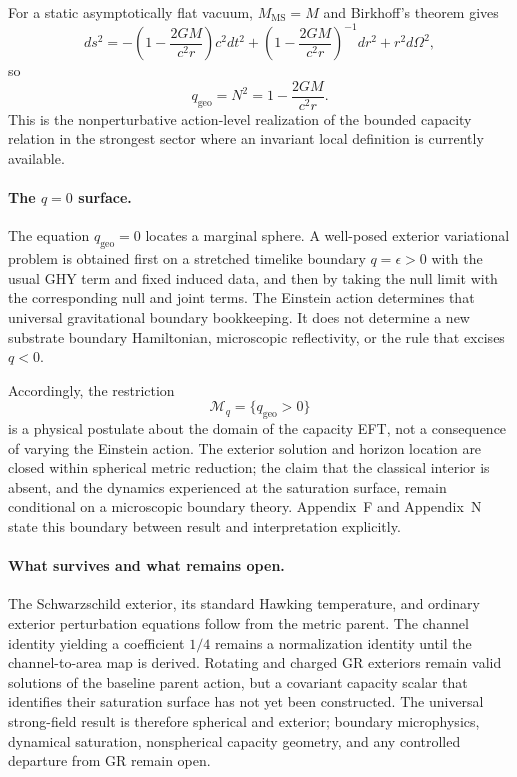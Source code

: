 \documentclass[11pt]{article}
\begin{document}
For a static asymptotically flat vacuum, $M_{\mathrm{MS}}=M$ and Birkhoff's theorem gives
\[
ds^2
=-\left(1-\frac{2GM}{c^2r}\right)c^2dt^2
+\left(1-\frac{2GM}{c^2r}\right)^{-1}dr^2+r^2d\Omega^2,
\]
so
\[
q_{\mathrm{geo}}=N^2
=1-\frac{2GM}{c^2r}.
\]
This is the nonperturbative action-level realization of the bounded capacity relation in the strongest sector where an invariant local definition is currently available.

\paragraph{The $q=0$ surface.}
The equation $q_{\mathrm{geo}}=0$ locates a marginal sphere. A well-posed exterior variational problem is obtained first on a stretched timelike boundary $q=\epsilon>0$ with the usual GHY term and fixed induced data, and then by taking the null limit with the corresponding null and joint terms. The Einstein action determines that universal gravitational boundary bookkeeping. It does not determine a new substrate boundary Hamiltonian, microscopic reflectivity, or the rule that excises $q<0$.

Accordingly, the restriction
\[
\mathcal M_q=\{q_{\mathrm{geo}}>0\}
\]
is a physical postulate about the domain of the capacity EFT, not a consequence of varying the Einstein action. The exterior solution and horizon location are closed within spherical metric reduction; the claim that the classical interior is absent, and the dynamics experienced at the saturation surface, remain conditional on a microscopic boundary theory. Appendix~F and Appendix~N state this boundary between result and interpretation explicitly.

\paragraph{What survives and what remains open.}
The Schwarzschild exterior, its standard Hawking temperature, and ordinary exterior perturbation equations follow from the metric parent. The channel identity yielding a coefficient $1/4$ remains a normalization identity until the channel-to-area map is derived. Rotating and charged GR exteriors remain valid solutions of the baseline parent action, but a covariant capacity scalar that identifies their saturation surface has not yet been constructed. The universal strong-field result is therefore spherical and exterior; boundary microphysics, dynamical saturation, nonspherical capacity geometry, and any controlled departure from GR remain open.
\end{document}
